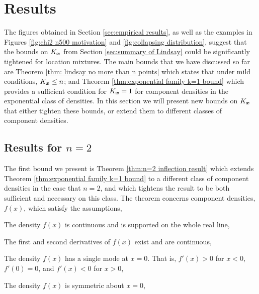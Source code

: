 	\section{Results}
		\label{sec:mixture results}
		The figures obtained in Section \ref{sec:empirical results}, as well as the examples in Figures \ref{fig:chi2 n500 motivation} and \ref{fig:collapsing distribution}, suggest that the bounds on $K_{\bm{{x}}}$ from Section \ref{sec:summary of Lindsay} could be significantly tightened for location mixtures. The main bounds that we have discussed so far are Theorem \ref{thm: lindsay no more than n points} which states that under mild conditions, $K_{\bm{{x}}} \leq n$; and Theorem \ref{thm:exponential family k=1 bound} which provides a sufficient condition for $K_{\bm{{x}}} = 1$ for component densities in the exponential class of densities. In this section we will present new bounds on $K_{\bm{{x}}}$ that either tighten these bounds, or extend them to different classes of component densities.

		\subsection{Results for \texorpdfstring{$n = 2$}{n = 2}}
		\label{sec:results for n = 2}
		The first bound we present is Theorem \ref{thm:n=2 inflection result} which extends Theorem \ref{thm:exponential family k=1 bound} to a different class of component densities in the case that $n=2$, and which tightens the result to be both sufficient and necessary on this class. The theorem concerns component densities, $f(x)$, which satisfy the assumptions,

		\begin{assumption}[Continuity]
		\label{assump:reallinesupport}
			The density $f(x)$ is continuous and is supported on the whole real line,
		\end{assumption}

		\begin{assumption}[Differentiability]
		\label{assump:twicediff}
			The first and second derivatives of $f(x)$ exist and are continuous,
		\end{assumption}
		
		\begin{assumption}[Unimodality]
			The density $f(x)$ has a single mode at $x=0$. That is, $f'(x) > 0$ for $x <0$, $f'(0) = 0$, and $f'(x) < 0$ for $x>0$,
			\label{assump:singlemode}
		\end{assumption}
		
		\begin{assumption}[Symmetry]
			The density $f(x)$ is symmetric about $x = 0$,
			\label{assump:symmetric}
		\end{assumption}
		
